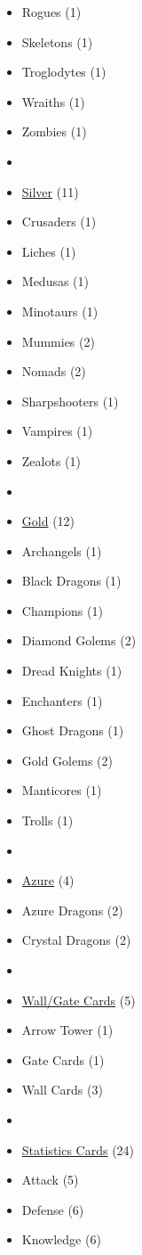 \begin{multicols}{3}
\begin{itemize}[leftmargin=0pt, label={}, noitemsep, noitemsep]
  \item Rogues (1)
  \item Skeletons (1)
  \item Troglodytes (1)
  \item Wraiths (1)
  \item Zombies (1)
  \item
  \item \underline{Silver} (11)
  \item Crusaders (1)
  \item Liches (1)
  \item Medusas (1)
  \item Minotaurs (1)
  \item Mummies (2)
  \item Nomads (2)
  \item Sharpshooters (1)
  \item Vampires (1)
  \item Zealots (1)
  \item
  \item \underline{Gold} (12)
  \item Archangels (1)
  \item Black Dragons (1)
  \item Champions (1)
  \item Diamond Golems (2)
  \item Dread Knights (1)
  \item Enchanters (1)
  \item Ghost Dragons (1)
  \item Gold Golems (2)
  \item Manticores (1)
  \item Trolls (1)
  \item
  \item \underline{Azure} (4)
  \item Azure Dragons (2)
  \item Crystal Dragons (2)
  \item
  \item \underline{Wall/Gate Cards} (5)
  \item Arrow Tower (1)
  \item Gate Cards (1)
  \item Wall Cards (3)
  \item
  \item \underline{Statistics Cards} (24)
  \item Attack (5)
  \item Defense (6)
  \item Knowledge (6)

\end{itemize}
\end{multicols}
